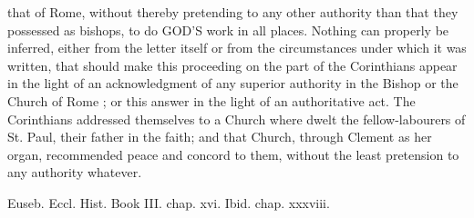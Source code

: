 that of Rome, without thereby pretending to any other authority than that they possessed as bishops, to do GOD'S work in all places. Nothing can properly be inferred, either from the letter itself or from the circumstances under which it was written, that should make this proceeding on the part of the Corinthians appear in the light of an acknowledgment of any superior authority in the Bishop or the Church of Rome ; or this answer in the light of an authoritative act. The Corinthians addressed themselves to a Church where dwelt the fellow-labourers of St. Paul, their father in the faith; and that Church, through Clement as her organ, recommended peace and concord to them, without the least pretension to any authority whatever.

Euseb. Eccl. Hist. Book III. chap. xvi. Ibid. chap. xxxviii.

